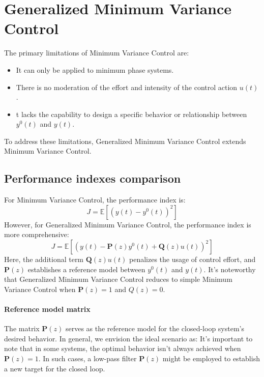 \section{Generalized Minimum Variance Control}

The primary limitations of Minimum Variance Control are:
\begin{itemize}
    \item It can only be applied to minimum phase systems.
    \item There is no moderation of the effort and intensity of the control action $u(t)$. 
    \item t lacks the capability to design a specific behavior or relationship between $y^{0}(t)$ and $y(t)$. 
\end{itemize}
To address these limitations, Generalized Minimum Variance Control extends Minimum Variance Control.

\subsection{Performance indexes comparison}
For Minimum Variance Control, the performance index is:
\[J=\mathbb{E}\left[\left(y(t)-y^{0}(t)\right)^2\right]\]
However, for Generalized Minimum Variance Control, the performance index is more comprehensive:
\[J=\mathbb{E}\left[\left(y(t)-\mathbf{P}(z)y^{0}(t)+\mathbf{Q}(z)u(t)\right)^2\right]\]
Here, the additional term $\mathbf{Q}(z)u(t)$ penalizes the usage of control effort, and $\mathbf{P}(z)$ establishes a reference model between $y^{0}(t)$ and $y(t)$. 
It's noteworthy that Generalized Minimum Variance Control reduces to simple Minimum Variance Control when $\mathbf{P}(z)=1$ and $Q(z)=0$. 

\paragraph*{Reference model matrix}
The matrix $\mathbf{P}(z)$ serves as the reference model for the closed-loop system's desired behavior. 
In general, we envision the ideal scenario as:
It's important to note that in some systems, the optimal behavior isn't always achieved when $\mathbf{P}(z)=1$. 
In such cases, a low-pass filter $\mathbf{P}(z)$ might be employed to establish a new target for the closed loop.